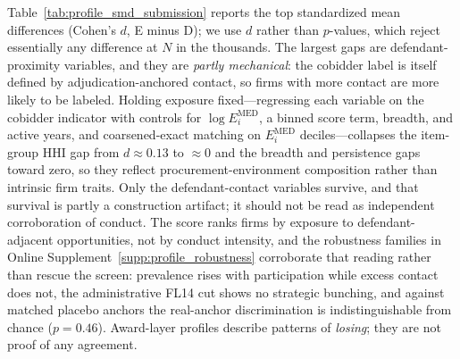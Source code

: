 Table~\ref{tab:profile_smd_submission} reports the top standardized mean
differences (Cohen's $d$, E minus D); we use $d$ rather than $p$-values,
which reject essentially any difference at $N$ in the thousands. The
largest gaps are defendant-proximity variables, and they are \emph{partly
mechanical}: the cobidder label is itself defined by adjudication-anchored
contact, so firms with more contact are more likely to be labeled.
Holding exposure fixed---regressing each variable on the cobidder
indicator with controls for $\log E_i^{\mathrm{MED}}$, a binned score
term, breadth, and active years, and coarsened-exact matching on
$E_i^{\mathrm{MED}}$ deciles---collapses the item-group HHI gap from
$d\approx0.13$ to $\approx0$ and the breadth and persistence gaps toward
zero, so they reflect procurement-environment composition rather than
intrinsic firm traits. Only the defendant-contact variables survive, and
that survival is partly a construction artifact; it should not be read as
independent corroboration of conduct. The score ranks firms by exposure
to defendant-adjacent opportunities, not by conduct intensity, and the
robustness families in Online Supplement~\ref{supp:profile_robustness}
corroborate that reading rather than rescue the screen: prevalence rises
with participation while excess contact does not, the administrative
FL14 cut shows no strategic bunching, and against matched placebo anchors
the real-anchor discrimination is indistinguishable from chance
($p=0.46$). Award-layer profiles describe patterns of \emph{losing}; they
are not proof of any agreement.


